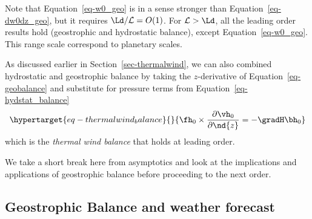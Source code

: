 \documentclass[
  letterpaper,
  twocolumn,
  landscape]{report}
\begin{document}
\begin{tcolorbox}[enhanced jigsaw, toprule=.15mm, left=2mm, opacityback=0, breakable, arc=.35mm, colback=white, rightrule=.15mm, bottomrule=.15mm, colframe=quarto-callout-note-color-frame, leftrule=.75mm]
\begin{minipage}[t]{5.5mm}
\textcolor{quarto-callout-note-color}{\faInfo}
\end{minipage}%
\begin{minipage}[t]{\textwidth - 5.5mm}

Note that Equation~\ref{eq-w0_geo} is in a sense stronger than
Equation~\ref{eq-dw0dz_geo}, but it requires
\({\Ld}/\mathcal{L} = O(1)\). For \(\mathcal{L}>{\Ld}\), all the leading
order results hold (geostrophic and hydrostatic balance), except
Equation~\ref{eq-w0_geo}. This range scale correspond to planetary
scales.

\end{minipage}%
\end{tcolorbox}

As discussed earlier in Section~\ref{sec-thermalwind}, we can also
combined hydrostatic and geostrophic balance by taking the
\(z\)-derivative of Equation~\ref{eq-geobalance} and substitute for
pressure terms from Equation~\ref{eq-hydstat_balance}
\begin{equation}\protect\hypertarget{eq-thermalwind_balance}{}{  \fh_0 \times \frac{\partial \vh_0}{\partial \nd{z}} = - \gradH \bh_0 }\label{eq-thermalwind_balance}\end{equation}
which is the \emph{thermal wind balance} that holds at leading order.

We take a short break here from asymptotics and look at the implications
and applications of geostrophic balance before proceeding to the next
order.

\hypertarget{geostrophic-balance-and-weather-forecast}{%
\subsection{Geostrophic Balance and weather
forecast}\label{geostrophic-balance-and-weather-forecast}}
\end{document}
